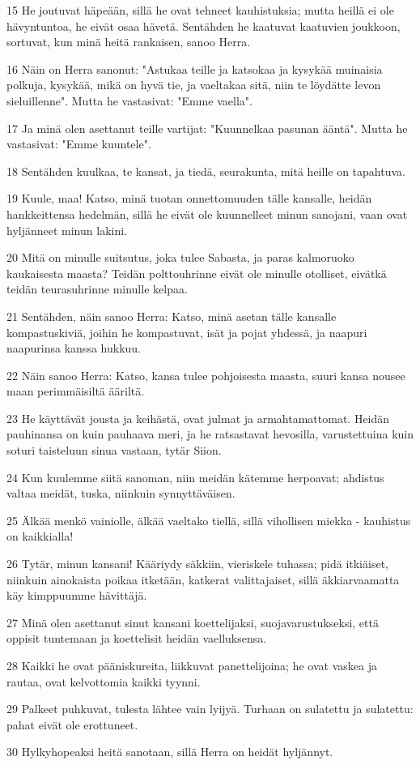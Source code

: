 \par 15 He joutuvat häpeään, sillä he ovat tehneet kauhistuksia; mutta heillä ei ole hävyntuntoa, he eivät osaa hävetä. Sentähden he kaatuvat kaatuvien joukkoon, sortuvat, kun minä heitä rankaisen, sanoo Herra.
\par 16 Näin on Herra sanonut: "Astukaa teille ja katsokaa ja kysykää muinaisia polkuja, kysykää, mikä on hyvä tie, ja vaeltakaa sitä, niin te löydätte levon sieluillenne". Mutta he vastasivat: "Emme vaella".
\par 17 Ja minä olen asettanut teille vartijat: "Kuunnelkaa pasunan ääntä". Mutta he vastasivat: "Emme kuuntele".
\par 18 Sentähden kuulkaa, te kansat, ja tiedä, seurakunta, mitä heille on tapahtuva.
\par 19 Kuule, maa! Katso, minä tuotan onnettomuuden tälle kansalle, heidän hankkeittensa hedelmän, sillä he eivät ole kuunnelleet minun sanojani, vaan ovat hyljänneet minun lakini.
\par 20 Mitä on minulle suitsutus, joka tulee Sabasta, ja paras kalmoruoko kaukaisesta maasta? Teidän polttouhrinne eivät ole minulle otolliset, eivätkä teidän teurasuhrinne minulle kelpaa.
\par 21 Sentähden, näin sanoo Herra: Katso, minä asetan tälle kansalle kompastuskiviä, joihin he kompastuvat, isät ja pojat yhdessä, ja naapuri naapurinsa kanssa hukkuu.
\par 22 Näin sanoo Herra: Katso, kansa tulee pohjoisesta maasta, suuri kansa nousee maan perimmäisiltä ääriltä.
\par 23 He käyttävät jousta ja keihästä, ovat julmat ja armahtamattomat. Heidän pauhinansa on kuin pauhaava meri, ja he ratsastavat hevosilla, varustettuina kuin soturi taisteluun sinua vastaan, tytär Siion.
\par 24 Kun kuulemme siitä sanoman, niin meidän kätemme herpoavat; ahdistus valtaa meidät, tuska, niinkuin synnyttäväisen.
\par 25 Älkää menkö vainiolle, älkää vaeltako tiellä, sillä vihollisen miekka - kauhistus on kaikkialla!
\par 26 Tytär, minun kansani! Kääriydy säkkiin, vieriskele tuhassa; pidä itkiäiset, niinkuin ainokaista poikaa itketään, katkerat valittajaiset, sillä äkkiarvaamatta käy kimppuumme hävittäjä.
\par 27 Minä olen asettanut sinut kansani koettelijaksi, suojavarustukseksi, että oppisit tuntemaan ja koettelisit heidän vaelluksensa.
\par 28 Kaikki he ovat pääniskureita, liikkuvat panettelijoina; he ovat vaskea ja rautaa, ovat kelvottomia kaikki tyynni.
\par 29 Palkeet puhkuvat, tulesta lähtee vain lyijyä. Turhaan on sulatettu ja sulatettu: pahat eivät ole erottuneet.
\par 30 Hylkyhopeaksi heitä sanotaan, sillä Herra on heidät hyljännyt.

